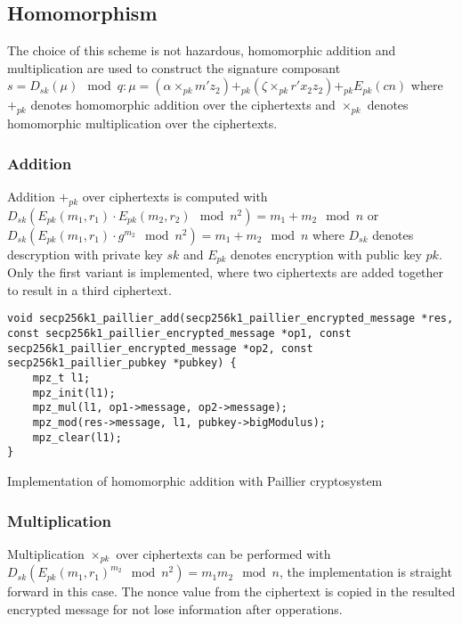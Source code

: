\subsection{Homomorphism}

The choice of this scheme is not hazardous, homomorphic addition and multiplication
are used to construct the signature composant $s = D_{sk}(\mu) \mod q : \mu =
(\alpha \times_{pk} m'z_2) +_{pk} (\zeta \times_{pk} r'x_2z_2) +_{pk} E_{pk}(cn)$
where $+_{pk}$ denotes homomorphic addition over the ciphertexts and $\times_{pk}$
denotes homomorphic multiplication over the ciphertexts.

\subsubsection{Addition}
Addition $+_{pk}$ over ciphertexts is computed with
$D_{sk}(E_{pk}(m_1, r_1) \cdot E_{pk}(m_2, r_2) \mod n^2) = m_1 + m_2 \mod n$ or
$D_{sk}(E_{pk}(m_1, r_1) \cdot g^{m_2} \mod n^2) = m_1 + m_2 \mod n$ where $D_{sk}$
denotes descryption with private key $sk$ and $E_{pk}$ denotes encryption with
public key $pk$. Only the first variant is implemented, where two ciphertexts are
added together to result in a third ciphertext.

\begin{listing}
  \begin{verbatim}
void secp256k1_paillier_add(secp256k1_paillier_encrypted_message *res, const secp256k1_paillier_encrypted_message *op1, const secp256k1_paillier_encrypted_message *op2, const secp256k1_paillier_pubkey *pubkey) {
    mpz_t l1;
    mpz_init(l1);
    mpz_mul(l1, op1->message, op2->message);
    mpz_mod(res->message, l1, pubkey->bigModulus);
    mpz_clear(l1);
}
  \end{verbatim}
	\caption{Implementation of homomorphic addition with Paillier cryptosystem}
	\label{lst:implHomomorphAddPaillier}
\end{listing}

\subsubsection{Multiplication}

Multiplication $\times_{pk}$ over ciphertexts can be performed with
$D_{sk}(E_{pk}(m_1, r_1)^{m_2} \mod n^2) = m_1 m_2 \mod n$, the implementation
is straight forward in this case. The nonce value from the ciphertext is copied
in the resulted encrypted message for not lose information after opperations.

